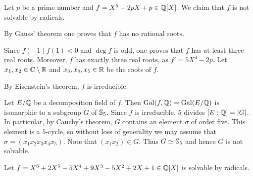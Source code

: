 \begin{example}
    Let $p$ be a prime number and $f=X^5-2pX+p\in\mathbb{Q}[X]$. 
    We claim that 
    $f$ is not solvable by radicals. 
    
    By Gauss' theorem 
    one proves that $f$ has no rational roots. 
    
    Since $f(-1)f(1)<0$ and 
    $\deg f$ is odd, one proves that $f$ 
    has at least three real roots. Moreover, 
    $f$ has exactly three real roots, as $f'=5X^4-2p$. Let 
    $x_1,x_2\in\mathbb{C}\setminus\mathbb{R}$ and $x_3,x_4,x_5\in\mathbb{R}$ be the roots
    of $f$. 
    
    By Eisenstein's theorem, $f$ is irreducible. 
    
    Let $E/\mathbb{Q}$ be a decomposition field of $f$. 
    Then $\operatorname{Gal}(f,\mathbb{Q})=\operatorname{Gal}(E/\mathbb{Q})$ is isomorphic to a subgroup $G$ of $\mathbb{S}_5$.
    Since 
    $f$ is irreducible, $5$ divides $[E:\mathbb{Q}]=|G|$. In particular, 
    by Cauchy's theorem, $G$ contains an element $\sigma$ of order five. This element
    is a $5$-cycle, so without loss of generality we may assume that 
    $\sigma=(x_1x_2x_3x_4x_5)$. Note that 
    $(x_1x_2)\in G$. Thus $G\simeq\mathbb{S}_5$ and hence
    $G$ is not solvable. 
\end{example}

\begin{exercise}
    Let $f=X^6+2X^5-5X^4+9X^3-5X^2+2X+1\in\mathbb{Q}[X]$ is solvable by radicals. 
\end{exercise}


